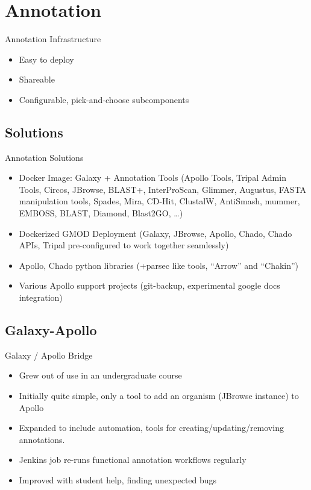\documentclass[12pt]{phage3slides} %
\begin{document}
\section{Annotation}
\begin{frame}{Annotation Infrastructure}
    \begin{itemize}
        \item Easy to deploy
        \item Shareable
        \item Configurable, pick-and-choose subcomponents
    \end{itemize}
\end{frame}

\subsection{Solutions}
\begin{frame}{Annotation Solutions}
    \begin{itemize}
        \item Docker Image: Galaxy + Annotation Tools {\color{gray}(Apollo Tools, Tripal Admin Tools, Circos, JBrowse, BLAST+, InterProScan, Glimmer, Augustus, FASTA manipulation tools, Spades, Mira, CD-Hit, ClustalW, AntiSmash, mummer, EMBOSS, BLAST, Diamond, Blast2GO, \ldots{})}
        \item Dockerized GMOD Deployment {\color{gray}(Galaxy, JBrowse, Apollo, Chado, Chado APIs, Tripal pre-configured to work together seamlessly)}
        \item Apollo, Chado python libraries {\color{gray}(+parsec like tools, ``Arrow'' and ``Chakin'')}
        \item Various Apollo support projects {\color{gray}(git-backup, experimental google docs integration)}
    \end{itemize}
\end{frame}

\subsection{Galaxy-Apollo}
\begin{frame}{Galaxy / Apollo Bridge}
    \begin{itemize}
        \item Grew out of use in an undergraduate course
        \item Initially quite simple, only a tool to add an organism (JBrowse instance) to Apollo
        \item Expanded to include automation, tools for creating/updating/removing annotations.
        \item Jenkins job re-runs functional annotation workflows regularly
        \item Improved with student help, finding unexpected bugs
    \end{itemize}
\end{frame}
\end{document}
